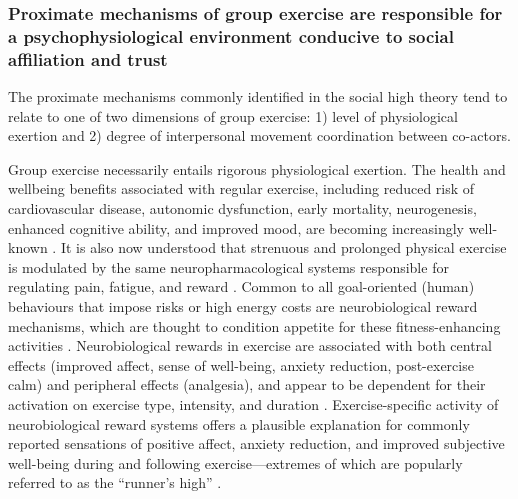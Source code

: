 \begin{CJK}{UTF8}{gbsn}
\subsubsection{Proximate mechanisms of group exercise are responsible for a psychophysiological environment conducive to social affiliation and trust}

The proximate mechanisms commonly identified in the social high theory tend to relate to one of two dimensions of group exercise: 1) level of physiological exertion and 2) degree of interpersonal movement coordination between co-actors.

Group exercise necessarily entails rigorous physiological exertion.
The health and wellbeing benefits associated with regular exercise, including reduced risk of cardiovascular disease, autonomic dysfunction, early mortality, neurogenesis, enhanced cognitive ability, and improved mood, are becoming increasingly well-known \citep{Blair1994,Nagamatsu2014}.  It is also now understood that strenuous and prolonged physical exercise is modulated by the same neuropharmacological systems responsible for regulating pain, fatigue, and reward \citep{Boecker2008,Raichlen2013}.  Common to all goal-oriented (human) behaviours that impose risks or high energy costs are neurobiological reward mechanisms, which are thought to condition appetite for these fitness-enhancing activities \citep{Burgdorf2006}.  Neurobiological rewards in exercise are associated with both central effects (improved affect, sense of well-being, anxiety reduction, post-exercise calm) and peripheral effects (analgesia), and appear to be dependent for their activation on exercise type, intensity, and duration \citep{Dietrich2004}.  Exercise-specific activity of neurobiological reward systems offers a plausible explanation for commonly reported sensations of positive affect, anxiety reduction, and improved subjective well-being during and following exercise---extremes of which are popularly referred to as the ``runner's high'' \citep{(Dietrich2004,Boecker2008,Raichlen2012}.


\end{CJK}
